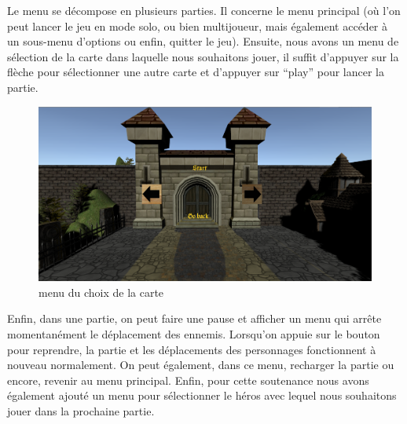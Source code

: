 \documentclass[a4paper, 12pt]{article}
\begin{document}
	Le menu se décompose en plusieurs parties. Il concerne le menu principal (où l’on peut lancer le jeu en mode solo, ou bien multijoueur, mais également accéder à un sous-menu d’options ou enfin, quitter le jeu). Ensuite, nous avons un menu de sélection de la carte dans laquelle nous souhaitons jouer, il suffit d’appuyer sur la flèche pour sélectionner une autre carte et d’appuyer sur “play” pour lancer la partie. 
	\begin{figure}[!ht]
		\centerline{\includegraphics[scale=0.3]{choixdemap.png}}
		\caption*{menu du choix de la carte}
	\end{figure}
	\par Enfin, dans une partie, on peut faire une pause et afficher un menu qui arrête momentanément le déplacement des ennemis. Lorsqu’on appuie sur le bouton pour reprendre, la partie et les déplacements des personnages fonctionnent à nouveau normalement. On peut également, dans ce menu, recharger la partie ou encore, revenir au menu principal. Enfin, pour cette soutenance nous avons également ajouté un menu pour sélectionner le héros avec lequel nous souhaitons jouer dans la prochaine partie.
\end{document}
